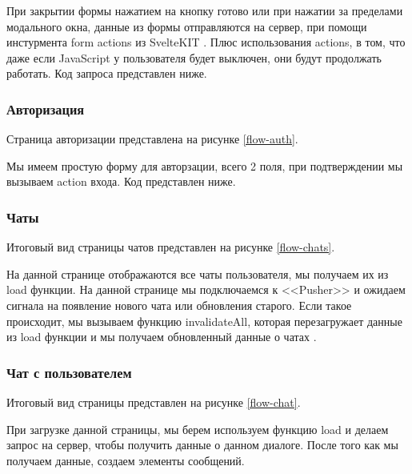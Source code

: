 При закрытии формы нажатием на кнопку готово или при нажатии за пределами модального окна, данные из формы отправляются на сервер, при помощи инстурмента form actions из SvelteKIT \cite{svelte-form-actions}. Плюс использования actions, в том, что даже если JavaScript у пользователя будет выключен, они будут продолжать работать. Код запроса представлен ниже.


\subsubsection{Авторизация}

Страница авторизации представлена на рисунке \ref{flow-auth}.


Мы имеем простую форму для авторзации, всего 2 поля, при подтверждении мы вызываем action входа. Код представлен ниже.


\subsubsection{Чаты}

Итоговый вид страницы чатов представлен на рисунке \ref{flow-chats}.


На данной странице отображаются все чаты пользователя, мы получаем их из load функции. На данной странице мы подключаемся к <<Pusher>> и ожидаем сигнала на появление нового чата или обновления старого. Если такое происходит, мы вызываем функцию invalidateAll, которая перезагружает данные из load функции и мы получаем обновленный данные о чатах \cite{svelte-invalidateall}.

\subsubsection{Чат с пользователем}

Итоговый вид страницы представлен на рисунке \ref{flow-chat}.


При загрузке данной страницы, мы берем используем функцию load и делаем запрос на сервер, чтобы получить данные о данном диалоге. После того как мы получаем данные, создаем элементы сообщений.

